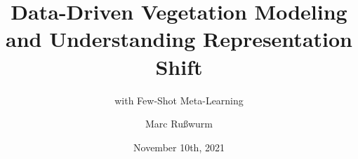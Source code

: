 \documentclass[11pt]{beamer}
\begin{document}
	
	\title{Data-Driven Vegetation Modeling and Understanding Representation Shift}
	\subtitle{with Few-Shot Meta-Learning}
	\author{Marc Ru\ss{}wurm}
	\date{November 10th, 2021}
	
	
	\begin{frame}[plain]
		\maketitle
	\end{frame}

%		
%	

%		
%			
%			
\end{document}
